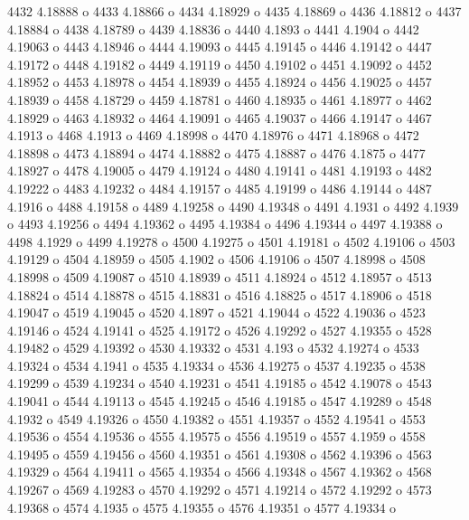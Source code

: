  4432  4.18888  o
 4433  4.18866  o
 4434  4.18929  o
 4435  4.18869  o
 4436  4.18812  o
 4437  4.18884  o
 4438  4.18789  o
 4439  4.18836  o
 4440  4.1893  o
 4441  4.1904  o
 4442  4.19063  o
 4443  4.18946  o
 4444  4.19093  o
 4445  4.19145  o
 4446  4.19142  o
 4447  4.19172  o
 4448  4.19182  o
 4449  4.19119  o
 4450  4.19102  o
 4451  4.19092  o
 4452  4.18952  o
 4453  4.18978  o
 4454  4.18939  o
 4455  4.18924  o
 4456  4.19025  o
 4457  4.18939  o
 4458  4.18729  o
 4459  4.18781  o
 4460  4.18935  o
 4461  4.18977  o
 4462  4.18929  o
 4463  4.18932  o
 4464  4.19091  o
 4465  4.19037  o
 4466  4.19147  o
 4467  4.1913  o
 4468  4.1913  o
 4469  4.18998  o
 4470  4.18976  o
 4471  4.18968  o
 4472  4.18898  o
 4473  4.18894  o
 4474  4.18882  o
 4475  4.18887  o
 4476  4.1875  o
 4477  4.18927  o
 4478  4.19005  o
 4479  4.19124  o
 4480  4.19141  o
 4481  4.19193  o
 4482  4.19222  o
 4483  4.19232  o
 4484  4.19157  o
 4485  4.19199  o
 4486  4.19144  o
 4487  4.1916  o
 4488  4.19158  o
 4489  4.19258  o
 4490  4.19348  o
 4491  4.1931  o
 4492  4.1939  o
 4493  4.19256  o
 4494  4.19362  o
 4495  4.19384  o
 4496  4.19344  o
 4497  4.19388  o
 4498  4.1929  o
 4499  4.19278  o
 4500  4.19275  o
 4501  4.19181  o
 4502  4.19106  o
 4503  4.19129  o
 4504  4.18959  o
 4505  4.1902  o
 4506  4.19106  o
 4507  4.18998  o
 4508  4.18998  o
 4509  4.19087  o
 4510  4.18939  o
 4511  4.18924  o
 4512  4.18957  o
 4513  4.18824  o
 4514  4.18878  o
 4515  4.18831  o
 4516  4.18825  o
 4517  4.18906  o
 4518  4.19047  o
 4519  4.19045  o
 4520  4.1897  o
 4521  4.19044  o
 4522  4.19036  o
 4523  4.19146  o
 4524  4.19141  o
 4525  4.19172  o
 4526  4.19292  o
 4527  4.19355  o
 4528  4.19482  o
 4529  4.19392  o
 4530  4.19332  o
 4531  4.193  o
 4532  4.19274  o
 4533  4.19324  o
 4534  4.1941  o
 4535  4.19334  o
 4536  4.19275  o
 4537  4.19235  o
 4538  4.19299  o
 4539  4.19234  o
 4540  4.19231  o
 4541  4.19185  o
 4542  4.19078  o
 4543  4.19041  o
 4544  4.19113  o
 4545  4.19245  o
 4546  4.19185  o
 4547  4.19289  o
 4548  4.1932  o
 4549  4.19326  o
 4550  4.19382  o
 4551  4.19357  o
 4552  4.19541  o
 4553  4.19536  o
 4554  4.19536  o
 4555  4.19575  o
 4556  4.19519  o
 4557  4.1959  o
 4558  4.19495  o
 4559  4.19456  o
 4560  4.19351  o
 4561  4.19308  o
 4562  4.19396  o
 4563  4.19329  o
 4564  4.19411  o
 4565  4.19354  o
 4566  4.19348  o
 4567  4.19362  o
 4568  4.19267  o
 4569  4.19283  o
 4570  4.19292  o
 4571  4.19214  o
 4572  4.19292  o
 4573  4.19368  o
 4574  4.1935  o
 4575  4.19355  o
 4576  4.19351  o
 4577  4.19334  o
